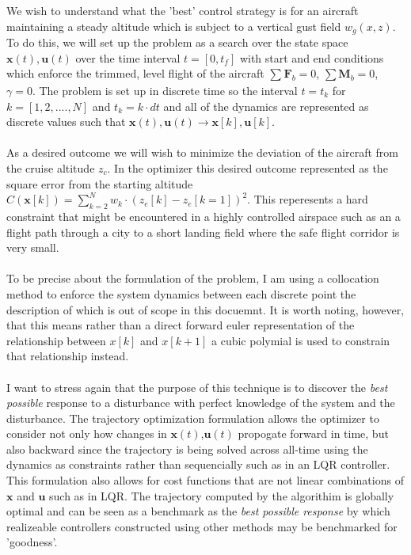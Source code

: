 \documentclass{article}
\begin{document}
We wish to understand what the 'best' control strategy is for an aircraft maintaining  a steady altitude which is subject to a vertical gust field $w_g(x,z)$. 
To do this, we will set up the problem as a search over the state space $\mathbf{x}(t), \mathbf{u}(t)$ over the time interval $t = [0, t_f]$ with start and end conditions which enforce the trimmed, level flight of the aircraft $\sum_{}^{}\mathbf{F}_b = 0$, $\sum\mathbf{M}_b = 0$, $\gamma = 0$. 
The problem is set up in discrete time so the interval $t = t_k$ for $ k= [1,2,...., N]$ and $t_k = k \cdot dt$ and all of the dynamics are represented as discrete values such that $\mathbf{x}(t),\mathbf{u}(t) \rightarrow \mathbf{x}[k],\mathbf{u}[k]$. \\
\\
As a desired outcome we will wish to minimize the deviation of the aircraft from the cruise altitude $z_c$. 
In the optimizer this desired outcome represented as the square error from the starting altitude $C(\mathbf{x}[k]) = \sum_{k=2}^{N} w_k \cdot(z_e[k] - z_e[k=1])^2$. 
This reperesents a hard constraint that might be encountered in a highly controlled airspace such as an a flight path through a city to a short landing field where the safe flight corridor is very small. \\
\\
To be precise about the formulation of the problem, I am using a collocation method to enforce the system dynamics between each discrete point the description of which is out of scope in this docuemnt. 
It is worth noting, however, that this means rather than a direct forward euler representation of the relationship between $x[k]$ and $x[k+1]$ a cubic polymial is used to constrain that relationship instead. \\
\\
I want to stress again that the purpose of this technique is to discover the \textit{best possible} response to a disturbance with perfect knowledge of the system and the disturbance. 
The trajectory optimization formulation allows the optimizer to consider not only how changes in $\mathbf{x}(t)$,$\mathbf{u}(t)$ propogate forward in time, but also backward since the trajectory is being solved across all-time using the dynamics as constraints rather than sequencially such as in an LQR controller. 
This formulation also allows for cost functions that are not linear combinations of $\mathbf{x}$ and $\mathbf{u}$ such as in LQR. 
The trajectory computed by the algorithim is globally optimal and can be seen as a benchmark as the \textit{best possible response} by which realizeable controllers constructed using other methods may be benchmarked for 'goodness'.
\end{document}
